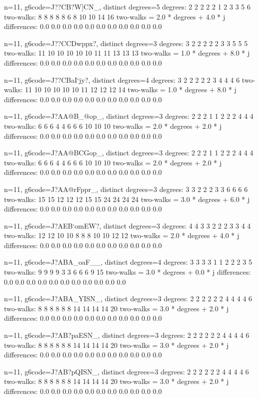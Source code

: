 {{{{{{{{n=11, g6code=J??CB?W]CN_, distinct degrees=5
degrees: 2 2 2 2 2 1 2 3 3 5 6 
two-walks: 8 8 8 8 8 6 8 10 10 14 16 
two-walks = 2.0 * degrees + 4.0 * j
differences: 0.0 0.0 0.0 0.0 0.0 0.0 0.0 0.0 0.0 0.0 0.0 

n=11, g6code=J??CCDwppx?, distinct degrees=3
degrees: 3 2 2 2 2 2 3 3 5 5 5 
two-walks: 11 10 10 10 10 10 11 11 13 13 13 
two-walks = 1.0 * degrees + 8.0 * j
differences: 0.0 0.0 0.0 0.0 0.0 0.0 0.0 0.0 0.0 0.0 0.0 

n=11, g6code=J??CBaI`jy?, distinct degrees=4
degrees: 3 2 2 2 2 2 3 4 4 4 6 
two-walks: 11 10 10 10 10 10 11 12 12 12 14 
two-walks = 1.0 * degrees + 8.0 * j
differences: 0.0 0.0 0.0 0.0 0.0 0.0 0.0 0.0 0.0 0.0 0.0 

n=11, g6code=J?AA@B_@op_, distinct degrees=3
degrees: 2 2 2 1 1 2 2 2 4 4 4 
two-walks: 6 6 6 4 4 6 6 6 10 10 10 
two-walks = 2.0 * degrees + 2.0 * j
differences: 0.0 0.0 0.0 0.0 0.0 0.0 0.0 0.0 0.0 0.0 0.0 

n=11, g6code=J?AA@BCGop_, distinct degrees=3
degrees: 2 2 2 1 1 2 2 2 4 4 4 
two-walks: 6 6 6 4 4 6 6 6 10 10 10 
two-walks = 2.0 * degrees + 2.0 * j
differences: 0.0 0.0 0.0 0.0 0.0 0.0 0.0 0.0 0.0 0.0 0.0 

n=11, g6code=J?AA@rFppr_, distinct degrees=3
degrees: 3 3 2 2 2 3 3 6 6 6 6 
two-walks: 15 15 12 12 12 15 15 24 24 24 24 
two-walks = 3.0 * degrees + 6.0 * j
differences: 0.0 0.0 0.0 0.0 0.0 0.0 0.0 0.0 0.0 0.0 0.0 

n=11, g6code=J?AEB`omEW?, distinct degrees=3
degrees: 4 4 3 3 2 2 2 3 3 4 4 
two-walks: 12 12 10 10 8 8 8 10 10 12 12 
two-walks = 2.0 * degrees + 4.0 * j
differences: 0.0 0.0 0.0 0.0 0.0 0.0 0.0 0.0 0.0 0.0 0.0 

n=11, g6code=J?ABA_oaF__, distinct degrees=4
degrees: 3 3 3 3 1 1 2 2 2 3 5 
two-walks: 9 9 9 9 3 3 6 6 6 9 15 
two-walks = 3.0 * degrees + 0.0 * j
differences: 0.0 0.0 0.0 0.0 0.0 0.0 0.0 0.0 0.0 0.0 0.0 

n=11, g6code=J?ABA_YISN_, distinct degrees=3
degrees: 2 2 2 2 2 2 4 4 4 4 6 
two-walks: 8 8 8 8 8 8 14 14 14 14 20 
two-walks = 3.0 * degrees + 2.0 * j
differences: 0.0 0.0 0.0 0.0 0.0 0.0 0.0 0.0 0.0 0.0 0.0 

n=11, g6code=J?AB?paESN_, distinct degrees=3
degrees: 2 2 2 2 2 2 4 4 4 4 6 
two-walks: 8 8 8 8 8 8 14 14 14 14 20 
two-walks = 3.0 * degrees + 2.0 * j
differences: 0.0 0.0 0.0 0.0 0.0 0.0 0.0 0.0 0.0 0.0 0.0 

n=11, g6code=J?AB?pQISN_, distinct degrees=3
degrees: 2 2 2 2 2 2 4 4 4 4 6 
two-walks: 8 8 8 8 8 8 14 14 14 14 20 
two-walks = 3.0 * degrees + 2.0 * j
differences: 0.0 0.0 0.0 0.0 0.0 0.0 0.0 0.0 0.0 0.0 0.0 

}}}}}}}}

